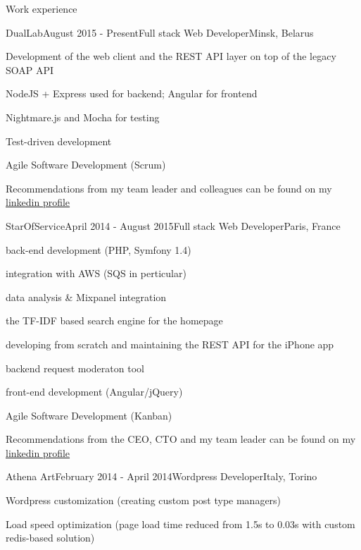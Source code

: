 \documentclass{resume} %
\begin{document}
\begin{rSection}{Work experience}

\begin{rSubsection}{DualLab}{August 2015 - Present}{Full stack Web Developer}{Minsk, Belarus}
\item Development of the web client and the REST API layer on top of the legacy SOAP API
\item NodeJS + Express used for backend; Angular for frontend
\item Nightmare.js and Mocha for testing
\item Test-driven development
\item Agile Software Development (Scrum)
\item Recommendations from my team leader and colleagues can be found on my \href{https://www.linkedin.com/pub/alexander-mikhalchenko/84/70b/357}{linkedin profile}
\end{rSubsection}

\clearpage



\begin{rSubsection}{StarOfService}{April 2014 - August 2015}{Full stack Web Developer}{Paris, France}
\item back-end development (PHP, Symfony 1.4)
\item integration with AWS (SQS in perticular)
\item data analysis \& Mixpanel integration
\item the TF-IDF based search engine for the homepage
\item developing from scratch and maintaining the REST API for the iPhone app 
\item backend request moderaton tool
\item front-end development (Angular/jQuery)
\item Agile Software Development (Kanban)
\item Recommendations from the CEO, CTO and my team leader can be found on my \href{https://www.linkedin.com/pub/alexander-mikhalchenko/84/70b/357}{linkedin profile}
\end{rSubsection}


\begin{rSubsection}{Athena Art}{February 2014 - April 2014}{Wordpress Developer}{Italy, Torino}
\item Wordpress customization (creating custom post type managers)
\item Load speed optimization (page load time reduced from 1.5s to 0.03s with custom redis-based solution)
\end{rSubsection}


\end{rSection}
\end{document}

